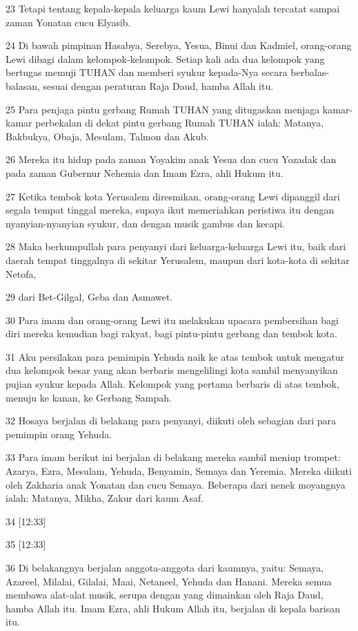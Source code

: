 \par 23 Tetapi tentang kepala-kepala keluarga kaum Lewi hanyalah tercatat sampai zaman Yonatan cucu Elyasib.
\par 24 Di bawah pimpinan Hasabya, Serebya, Yesua, Binui dan Kadmiel, orang-orang Lewi dibagi dalam kelompok-kelompok. Setiap kali ada dua kelompok yang bertugas memuji TUHAN dan memberi syukur kepada-Nya secara berbalas-balasan, sesuai dengan peraturan Raja Daud, hamba Allah itu.
\par 25 Para penjaga pintu gerbang Rumah TUHAN yang ditugaskan menjaga kamar-kamar perbekalan di dekat pintu gerbang Rumah TUHAN ialah: Matanya, Bakbukya, Obaja, Mesulam, Talmon dan Akub.
\par 26 Mereka itu hidup pada zaman Yoyakim anak Yesua dan cucu Yozadak dan pada zaman Gubernur Nehemia dan Imam Ezra, ahli Hukum itu.
\par 27 Ketika tembok kota Yerusalem diresmikan, orang-orang Lewi dipanggil dari segala tempat tinggal mereka, supaya ikut memeriahkan peristiwa itu dengan nyanyian-nyanyian syukur, dan dengan musik gambus dan kecapi.
\par 28 Maka berkumpullah para penyanyi dari keluarga-keluarga Lewi itu, baik dari daerah tempat tinggalnya di sekitar Yerusalem, maupun dari kota-kota di sekitar Netofa,
\par 29 dari Bet-Gilgal, Geba dan Asmawet.
\par 30 Para imam dan orang-orang Lewi itu melakukan upacara pembersihan bagi diri mereka kemudian bagi rakyat, bagi pintu-pintu gerbang dan tembok kota.
\par 31 Aku persilakan para pemimpin Yehuda naik ke atas tembok untuk mengatur dua kelompok besar yang akan berbaris mengelilingi kota sambil menyanyikan pujian syukur kepada Allah. Kelompok yang pertama berbaris di atas tembok, menuju ke kanan, ke Gerbang Sampah.
\par 32 Hosaya berjalan di belakang para penyanyi, diikuti oleh sebagian dari para pemimpin orang Yehuda.
\par 33 Para imam berikut ini berjalan di belakang mereka sambil meniup trompet: Azarya, Ezra, Mesulam, Yehuda, Benyamin, Semaya dan Yeremia. Mereka diikuti oleh Zakharia anak Yonatan dan cucu Semaya. Beberapa dari nenek moyangnya ialah: Matanya, Mikha, Zakur dari kaum Asaf.
\par 34 [12:33]
\par 35 [12:33]
\par 36 Di belakangnya berjalan anggota-anggota dari kaumnya, yaitu: Semaya, Azareel, Milalai, Gilalai, Maai, Netaneel, Yehuda dan Hanani. Mereka semua membawa alat-alat musik, serupa dengan yang dimainkan oleh Raja Daud, hamba Allah itu. Imam Ezra, ahli Hukum Allah itu, berjalan di kepala barisan itu.
